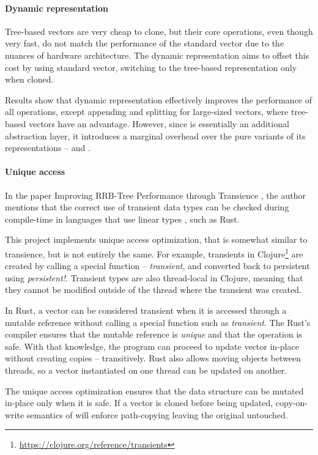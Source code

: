 \paragraph{Dynamic representation}
Tree-based vectors are very cheap to clone, but their core operations, even though very fast, do not match the performance of the standard vector due to the nuances of hardware architecture. The dynamic representation aims to offset this cost by using standard vector, switching to the tree-based representation only when cloned.

Results show that dynamic representation effectively improves the performance of all \pvec{} operations, except appending and splitting for large-sized vectors, where tree-based vectors have an advantage. However, since \pvec{} is essentially an additional abstraction layer, it introduces a marginal overhead over the pure variants of its representations -- \stdvec{} and \rrbvec{}.

\paragraph{Unique access}
In the paper Improving RRB-Tree Performance through Transience \cite{improving-performance-through-transience}, the author mentions that the correct use of transient data types can be checked during compile-time in languages that use linear types \cite{linear-types-can-change-the-world}, such as Rust.

This project implements unique access optimization, that is somewhat similar to transience, but is not entirely the same. For example, transients in Clojure\footnote{\url{https://clojure.org/reference/transients}} are created by calling a special function -- \emph{transient}, and converted back to persistent using \emph{persistent!}. Transient types are also thread-local in Clojure, meaning that they cannot be modified outside of the thread where the transient was created.

In Rust, a vector can be considered transient when it is accessed through a mutable reference without calling a special function such as \emph{transient}. The Rust's compiler ensures that the mutable reference is \emph{unique} and that the operation is safe. With that knowledge, the program can proceed to update vector in-place without creating copies -- transitively. Rust also allows moving objects between threads, so a vector instantiated on one thread can be updated on another.

The unique access optimization ensures that the data structure can be mutated in-place only when it is safe. If a vector is cloned before being updated, copy-on-write semantics of \rc{} will enforce path-copying leaving the original untouched.

